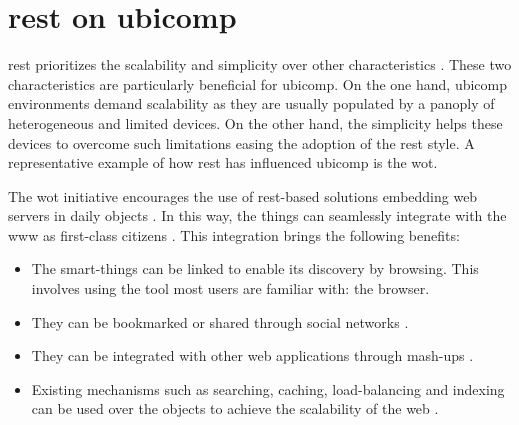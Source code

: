 \section{\acs{rest} on \acs{ubicomp}}
\label{sec:soa_ubicomp}

\ac{rest} prioritizes the scalability and simplicity over other characteristics \citep{fielding_architectural_2000}.
These two characteristics are particularly beneficial for \ac{ubicomp}.
On the one hand, \ac{ubicomp} environments demand scalability as they are usually populated by a panoply of heterogeneous and limited devices.
On the other hand, the simplicity helps these devices to overcome such limitations easing the adoption of the \ac{rest} style.
A representative example of how \ac{rest} has influenced \ac{ubicomp} is the \acf{wot}.




The \acl{wot} initiative encourages the use of \acs{rest}-based solutions embedding web servers in daily objects \citep{guinard_internet_2011,guinard_thesis_2011}.
In this way, the things can seamlessly integrate with the \ac{www} as first-class citizens \citep{gupta_network_2011}. %
This integration brings the following benefits:
\begin{itemize}
  \item The smart-things can be linked to enable its discovery by browsing.
	This involves using the tool most users are familiar with: the browser.
  \item They can be bookmarked or shared through social networks \citep{guinard_sharing_2010}.
  \item They can be integrated with other web applications through mash-ups \citep{guinard_towards_2009,ostermaier_webplug:_2010,pintus_anatomy_2011,blackstock_wotkit:_2012,stirbu_towards_2008}.
  \item Existing mechanisms such as searching, caching, load-balancing and indexing can be used over the objects to achieve the scalability of the web \citep{gupta_early_2010}.
\end{itemize}





